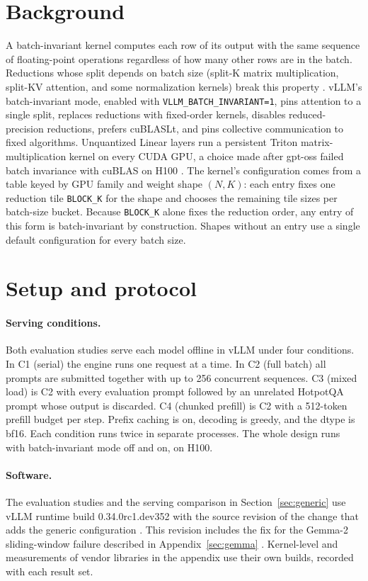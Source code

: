 \section{Background}
A batch-invariant kernel computes each row of its output with the same sequence of floating-point operations regardless of how many other rows are in the batch. Reductions whose split depends on batch size (split-K matrix multiplication, split-KV attention, and some normalization kernels) break this property \citep{he2025nondeterminism}. vLLM's batch-invariant mode, enabled with \texttt{VLLM\_BATCH\_INVARIANT=1}, pins attention to a single split, replaces reductions with fixed-order kernels, disables reduced-precision reductions, prefers cuBLASLt, and pins collective communication to fixed algorithms. Unquantized Linear layers run a persistent Triton matrix-multiplication kernel on every CUDA GPU, a choice made after gpt-oss failed batch invariance with cuBLAS on H100 \citep{vllm35404}. The kernel's configuration comes from a table keyed by GPU family and weight shape $(N, K)$: each entry fixes one reduction tile \texttt{BLOCK\_K} for the shape and chooses the remaining tile sizes per batch-size bucket. Because \texttt{BLOCK\_K} alone fixes the reduction order, any entry of this form is batch-invariant by construction. Shapes without an entry use a single default configuration for every batch size.

\section{Setup and protocol}
\paragraph{Serving conditions.} Both evaluation studies serve each model offline in vLLM under four conditions. In C1 (serial) the engine runs one request at a time. In C2 (full batch) all prompts are submitted together with up to 256 concurrent sequences. C3 (mixed load) is C2 with every evaluation prompt followed by an unrelated HotpotQA prompt whose output is discarded. C4 (chunked prefill) is C2 with a 512-token prefill budget per step. Prefix caching is on, decoding is greedy, and the dtype is bf16. Each condition runs twice in separate processes. The whole design runs with batch-invariant mode off and on, on H100.
\paragraph{Software.} The evaluation studies and the serving comparison in Section~\ref{sec:generic} use vLLM runtime build 0.34.0rc1.dev352 with the source revision of the change that adds the generic configuration \citep{vllm67376}. This revision includes the fix for the Gemma-2 sliding-window failure described in Appendix~\ref{sec:gemma} \citep{vllm65627}. Kernel-level and measurements of vendor libraries in the appendix use their own builds, recorded with each result set.
